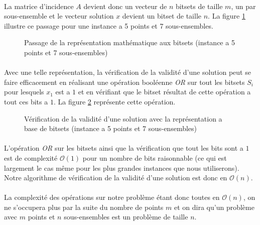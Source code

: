 \documentclass[12pt,letterpaper,twoside]{article}
\begin{document}
			\paragraph*{}
				La matrice d'incidence \(A\) devient donc un vecteur de \(n\) bitsets de taille \(m\), un par sous-ensemble et le vecteur solution \(x\) devient un bitset de taille \(n\). La figure \ref{fig:representation_to_bitsets} illustre ce passage pour une instance a 5 points et 7 sous-ensembles.
			\begin{figure}[H]
				\centering%
				\resizebox{0.8\textwidth}{!}{}%
				\caption{Passage de la représentation mathématique aux bitsets (instance a 5 points et 7 sous-ensembles)}%
				\label{fig:representation_to_bitsets}%
			\end{figure}
			\paragraph*{}
				Avec une telle représentation, la vérification de la validité d'une solution peut se faire efficacement en réalisant une opération booléenne \textit{OR} sur tout les bitsets \(S_i\) pour lesquels \(x_1\) est a \(1\) et en vérifiant que le bitset résultat de cette opération a tout ces bits a \(1\). La figure \ref{fig:solution_validity_check_function} représente cette opération.
			\begin{figure}[H]
				\centering%
				\resizebox{\textwidth}{!}{}%
				\caption{Vérification de la validité d'une solution avec la représentation a base de bitsets (instance a 5 points et 7 sous-ensembles)}%
				\label{fig:solution_validity_check_function}%
			\end{figure}
			\paragraph*{}
				L'opération \textit{OR} sur les bitsets ainsi que la vérification que tout les bits sont a \(1\) est de complexité \(\mathcal{O}(1)\) pour un nombre de bits raisonnable (ce qui est largement le cas même pour les plus grandes instances que nous utiliserons). Notre algorithme de vérification de la validité d'une solution est donc en \(\mathcal{O}(n)\).
			\paragraph*{}
				La complexité des opérations sur notre problème étant donc toutes en \(\mathcal{O}(n)\), on ne s'occupera plus par la suite du nombre de points \(m\) et on dira qu'un problème avec \(m\) points et \(n\) sous-ensembles est un problème de taille \(n\).
\end{document}

